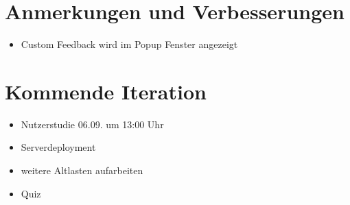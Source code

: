\documentclass[colorback, accentcolor=tud1c, paper=a4]{tudexercise}
\begin{document}
\begin{multicols}{2}
\section*{Anmerkungen und Verbesserungen}
\begin{itemize}
	\item Custom Feedback wird im Popup Fenster angezeigt
\end{itemize}

\section*{Kommende Iteration}
\begin{itemize}
	\item Nutzerstudie 06.09. um 13:00 Uhr
	\item Serverdeployment
	\item weitere Altlasten aufarbeiten
	\item Quiz
\end{itemize}

\end{multicols}
\end{document}
